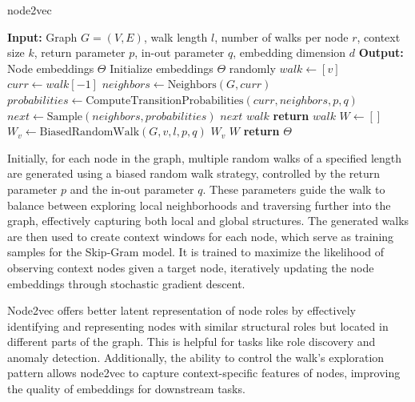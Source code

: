 \begin{algorithm}[h]
\vspace{0.5cm}
\caption{node2vec}
\begin{algorithmic}[1]
\State \textbf{Input:} Graph $G = (V, E)$, walk length $l$, number of walks per node $r$, context size $k$, return parameter $p$, in-out parameter $q$, embedding dimension $d$
\State \textbf{Output:} Node embeddings $\Theta$
\State Initialize embeddings $\Theta$ randomly
    \State $walk \gets [v]$
        \State $curr \gets walk[-1]$
        \State $neighbors \gets \text{Neighbors}(G, curr)$
        \State $probabilities \gets \text{ComputeTransitionProbabilities}(curr, neighbors, p, q)$
        \State $next \gets \text{Sample}(neighbors, probabilities)$
        \State {} $next$  $walk$
    \EndFor
    \State \textbf{return} $walk$
\EndFunction
\State $W \gets []$ 
        \State $W_v \gets \text{BiasedRandomWalk}(G, v, l, p, q)$
        \State {} $W_v$  $W$
    \EndFor
\EndFor
\State {}
\State \textbf{return} $\Theta$
\end{algorithmic}
\label{n2v_alg}
\vspace{1.0cm}
\end{algorithm}

Initially, for each node in the graph, multiple random walks of a specified length are generated using a biased random walk strategy, controlled by the return parameter 
$p$ and the in-out parameter 
$q$. These parameters guide the walk to balance between exploring local neighborhoods and traversing further into the graph, effectively capturing both local and global structures. The generated walks are then used to create context windows for each node, which serve as training samples for the Skip-Gram model. It is trained to maximize the likelihood of observing context nodes given a target node, iteratively updating the node embeddings through stochastic gradient descent.

Node2vec offers better latent representation of node roles by effectively identifying and representing nodes with similar structural roles but located in different parts of the graph. This is helpful for tasks like role discovery and anomaly detection. Additionally, the ability to control the walk’s exploration pattern allows node2vec to capture context-specific features of nodes, improving the quality of embeddings for downstream tasks.

